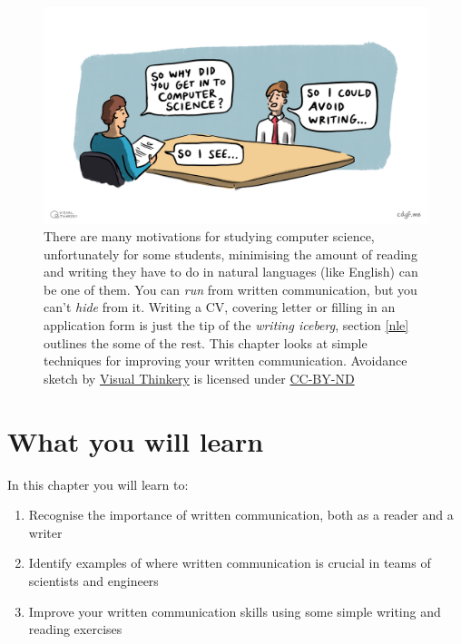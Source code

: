 \documentclass[
]{book}
\providecommand{\tightlist}{%
  \setlength{\itemsep}{0pt}\setlength{\parskip}{0pt}}
\begin{document}
\begin{figure}

{\centering \includegraphics[width=1\linewidth]{images/Avoiding writing} 

}

\caption{There are many motivations for studying computer science, unfortunately for some students, minimising the amount of reading and writing they have to do in natural languages (like English) can be one of them. You can \emph{run} from written communication, but you can't \emph{hide} from it. Writing a CV, covering letter or filling in an application form is just the tip of the \emph{writing iceberg}, section \ref{nle} outlines the some of the rest. This chapter looks at simple techniques for improving your written communication. Avoidance sketch by \href{https://visualthinkery.com}{Visual Thinkery} is licensed under \href{https://creativecommons.org/licenses/by-nd/4.0/}{CC-BY-ND}}\label{fig:no-writing-fig}
\end{figure}



\hypertarget{what-you-will-learn}{%
\section{What you will learn}\label{what-you-will-learn}}

In this chapter you will learn to:

\begin{enumerate}
\def\labelenumi{\arabic{enumi}.}
\tightlist
\item
  Recognise the importance of written communication, both as a reader and a writer
\item
  Identify examples of where written communication is crucial in teams of scientists and engineers
\item
  Improve your written communication skills using some simple writing and reading exercises
\end{enumerate}
\end{document}
